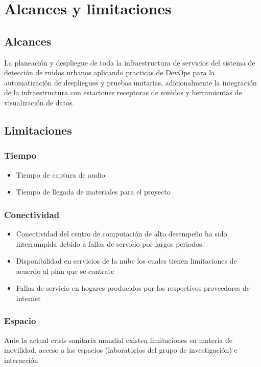 \chapter{Alcances y limitaciones}
\section{Alcances}
La planeación y despliegue de toda la infraestructura de servicios del sistema de detección de ruidos urbanos aplicando practicas de DevOps para la automatización de despliegues y pruebas unitarias, adicionalmente la integración de la infraestructura con estaciones receptoras de sonidos y herramientas de visualización de datos.
\section{Limitaciones}
\subsection{Tiempo}
\begin{itemize}
\item Tiempo de captura de audio
\item Tiempo de llegada de materiales para el proyecto
\end{itemize}
\subsection{Conectividad}
\begin{itemize}
\item Conectividad del centro de computación de alto desempeño ha sido interrumpida debido a fallas de servicio por largos periodos.
\item Disponibilidad en servicios de la nube los cuales tienen limitaciones de acuerdo al plan que se contrate
\item Fallas de servicio en hogares producidos por los respectivos proveedores de internet
\end{itemize}
\subsection{Espacio}
Ante la actual crisis sanitaria mundial existen limitaciones en materia de movilidad, acceso a los espacios (laboratorios del grupo de investigación) e interacción 
